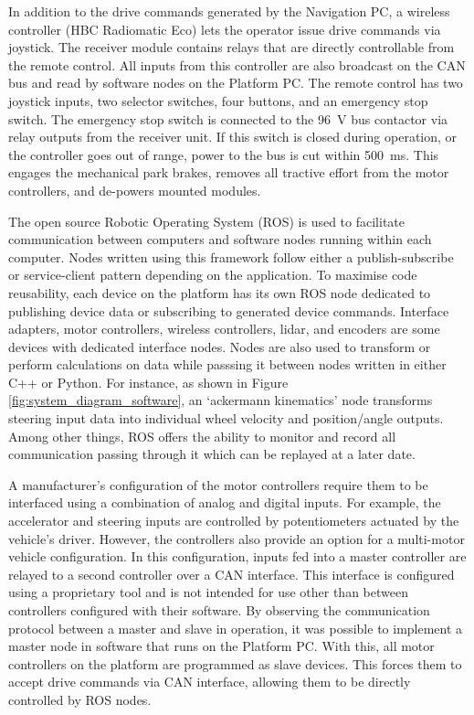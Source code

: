 \documentclass[preprint,authoryear,12pt]{elsarticle}
\begin{document}
        In addition to the drive commands generated by the Navigation PC, a wireless controller (HBC Radiomatic Eco) lets the operator issue drive commands via joystick.
        The receiver module contains relays that are directly controllable from the remote control.
        All inputs from this controller are also broadcast on the CAN bus and read by software nodes on the Platform PC.
        The remote control has two joystick inputs, two selector switches, four buttons, and an emergency stop switch.
        The emergency stop switch is connected to the \SI{96}{\volt} bus contactor via relay outputs from the receiver unit.
        If this switch is closed during operation, or the controller goes out of range, power to the bus is cut within \SI{500}{\milli\second}.
        This engages the mechanical park brakes, removes all tractive effort from the motor controllers, and de-powers mounted modules.

        The open source Robotic Operating System (ROS) is used to facilitate communication between computers and software nodes running within each computer.
        Nodes written using this framework follow either a publish-subscribe or service-client pattern depending on the application.
        To maximise code reusability, each device on the platform has its own ROS node dedicated to publishing device data or subscribing to generated device commands.
        Interface adapters, motor controllers, wireless controllers, lidar, and encoders are some devices with dedicated interface nodes.
        Nodes are also used to transform or perform calculations on data while passsing it between nodes written in either C++ or Python.
        For instance, as shown in Figure \ref{fig:system_diagram_software}, an `ackermann kinematics' node transforms steering input data into individual wheel velocity and position/angle outputs.
        Among other things, ROS offers the ability to monitor and record all communication passing through it which can be replayed at a later date.

        A manufacturer's configuration of the motor controllers require them to be interfaced using a combination of analog and digital inputs.
        For example, the accelerator and steering inputs are controlled by potentiometers actuated by the vehicle's driver.
        However, the controllers also provide an option for a multi-motor vehicle configuration.
        In this configuration, inputs fed into a master controller are relayed to a second controller over a CAN interface.
        This interface is configured using a proprietary tool and is not intended for use other than between controllers configured with their software.
        By observing the communication protocol between a master and slave in operation, it was possible to implement a master node in software that runs on the Platform PC.
        With this, all motor controllers on the platform are programmed as slave devices.
        This forces them to accept drive commands via CAN interface, allowing them to be directly controlled by ROS nodes.
\end{document}
